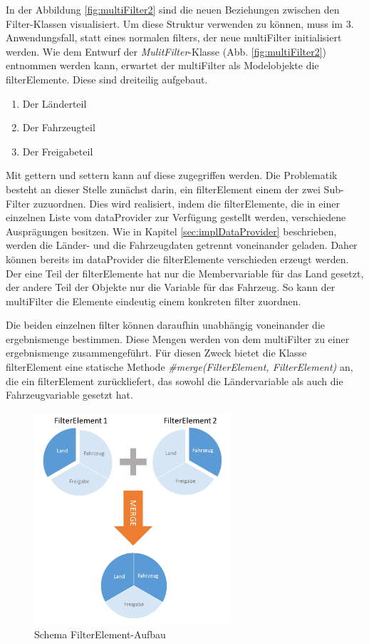 In der Abbildung \ref{fig:multiFilter2} sind die neuen Beziehungen zwischen den Filter-Klassen visualisiert. Um diese Struktur verwenden zu können, muss im 3. Anwendungsfall, statt eines normalen \gls{filter}s, der neue \gls{multiFilter} initialisiert werden. Wie dem Entwurf der \textit{MulitFilter}-Klasse (Abb. \ref{fig:multiFilter2}) entnommen werden kann, erwartet der \gls{multiFilter} als Modelobjekte die \gls{filterElement}e. Diese sind dreiteilig aufgebaut.

\begin{enumerate}
	\item Der Länderteil
	\item Der Fahrzeugteil
	\item Der Freigabeteil
\end{enumerate}

Mit \gls{getter}n und \gls{setter}n kann auf diese zugegriffen werden. Die Problematik besteht an dieser Stelle zunächst darin, ein \gls{filterElement} einem der zwei Sub-Filter zuzuordnen. Dies wird realisiert, indem die \gls{filterElement}e, die in einer einzelnen Liste vom \gls{dataProvider} zur Verfügung gestellt werden, verschiedene Ausprägungen besitzen. Wie in Kapitel \ref{sec:implDataProvider} beschrieben, werden die Länder- und die Fahrzeugdaten getrennt voneinander geladen. Daher können bereits im \gls{dataProvider} die \gls{filterElement}e verschieden erzeugt werden. Der eine Teil der \gls{filterElement}e hat nur die Membervariable für das Land gesetzt, der andere Teil der Objekte nur die Variable für das Fahrzeug. So kann der \gls{multiFilter} die Elemente eindeutig einem konkreten \gls{filter} zuordnen.

Die beiden einzelnen \gls{filter} können daraufhin unabhängig voneinander die \gls{ergebnismenge} bestimmen. Diese Mengen werden von dem \gls{multiFilter} zu einer \gls{ergebnismenge} zusammengeführt. Für diesen Zweck bietet die Klasse \gls{filterElement} eine statische Methode \textit{\#merge(FilterElement, FilterElement)} an, die ein \gls{filterElement} zurückliefert, das sowohl die Ländervariable als auch die Fahrzeugvariable gesetzt hat.

\begin{figure}[H]
 \centering
 \includegraphics[width=0.65\textwidth]{grafiken/Multi_FilterElement.png}
 \caption{Schema FilterElement-Aufbau}
 \label{fig:multiFilter3}
\end{figure}

